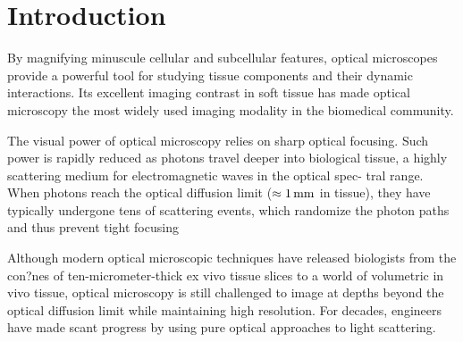 \section{Introduction}
\label{sec:Introduction}

By magnifying minuscule cellular and subcellular features, optical microscopes provide a powerful tool for studying tissue components and their dynamic interactions. Its excellent imaging contrast in soft tissue has made optical microscopy the most widely used imaging modality in the biomedical community.\cite{2000_Amos_Lessonsfromhistory}  

The visual power of optical microscopy relies on sharp optical focusing. Such power is rapidly reduced as photons travel deeper into biological tissue, a highly scattering medium for electromagnetic waves in the optical spec- tral range. When photons reach the optical diffusion limit ($\approx \unit[1]{mm}$ in tissue), they have typically undergone tens of scattering events, which randomize the photon paths and thus prevent tight focusing~\cite{2000_Fujimoto_Opticalcoherencetomography:}

Although modern optical microscopic techniques have released biologists from the con?nes of ten-micrometer-thick ex vivo tissue slices to a world of volumetric in vivo tissue, optical microscopy is still challenged to image at depths beyond the optical diffusion limit while maintaining high resolution. For decades, engineers have made scant progress by using pure optical approaches to light scattering. 